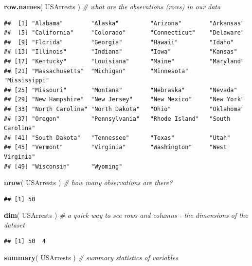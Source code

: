 \documentclass[]{book}
\newenvironment{Shaded}{\begin{snugshade}}{\end{snugshade}}
\newcommand{\CommentTok}[1]{\textcolor[rgb]{0.56,0.35,0.01}{\textit{#1}}}
\newcommand{\KeywordTok}[1]{\textcolor[rgb]{0.13,0.29,0.53}{\textbf{#1}}}
\newcommand{\NormalTok}[1]{#1}
\theoremstyle{definition}
\theoremstyle{definition}
\theoremstyle{definition}
\theoremstyle{remark}
\begin{document}
\begin{Shaded}
\begin{Highlighting}[]
\KeywordTok{row.names}\NormalTok{( USArrests )   }\CommentTok{# what are the obsevations (rows) in our data}
\end{Highlighting}
\end{Shaded}

\begin{verbatim}
##  [1] "Alabama"        "Alaska"         "Arizona"        "Arkansas"      
##  [5] "California"     "Colorado"       "Connecticut"    "Delaware"      
##  [9] "Florida"        "Georgia"        "Hawaii"         "Idaho"         
## [13] "Illinois"       "Indiana"        "Iowa"           "Kansas"        
## [17] "Kentucky"       "Louisiana"      "Maine"          "Maryland"      
## [21] "Massachusetts"  "Michigan"       "Minnesota"      "Mississippi"   
## [25] "Missouri"       "Montana"        "Nebraska"       "Nevada"        
## [29] "New Hampshire"  "New Jersey"     "New Mexico"     "New York"      
## [33] "North Carolina" "North Dakota"   "Ohio"           "Oklahoma"      
## [37] "Oregon"         "Pennsylvania"   "Rhode Island"   "South Carolina"
## [41] "South Dakota"   "Tennessee"      "Texas"          "Utah"          
## [45] "Vermont"        "Virginia"       "Washington"     "West Virginia" 
## [49] "Wisconsin"      "Wyoming"
\end{verbatim}

\begin{Shaded}
\begin{Highlighting}[]
\KeywordTok{nrow}\NormalTok{( USArrests )   }\CommentTok{# how many observations are there?}
\end{Highlighting}
\end{Shaded}

\begin{verbatim}
## [1] 50
\end{verbatim}

\begin{Shaded}
\begin{Highlighting}[]
\KeywordTok{dim}\NormalTok{( USArrests )    }\CommentTok{# a quick way to see rows and columns - the dimensions of the dataset}
\end{Highlighting}
\end{Shaded}

\begin{verbatim}
## [1] 50  4
\end{verbatim}

\begin{Shaded}
\begin{Highlighting}[]
\KeywordTok{summary}\NormalTok{( USArrests )   }\CommentTok{# summary statistics of variables}
\end{Highlighting}
\end{Shaded}
\end{document}
